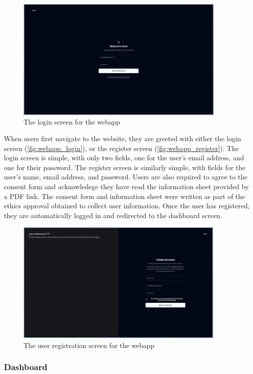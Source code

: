 \begin{figure}[htbp]
  \centering
  \includegraphics[height=6cm]{figures/fyp_login.jpeg}
  \captionsetup{justification=centering}
  \caption[Webapp Login]{The login screen for the webapp} \label{fig:webapp_login}
\end{figure}
When users first navigate to the website, they are greeted with either the login screen (\autoref{fig:webapp_login}), or the register screen (\autoref{fig:webapp_register}). The login screen is simple, with only two fields, one for the user's email address, and one for their password. The register screen is similarly simple, with fields for the user's name, email address, and password. Users are also required to agree to the consent form and acknowledege they have read the information sheet provided by a PDF link. The consent form and information sheet were written as part of the ethics approval obtained to collect user information. Once the user has registered, they are automatically logged in and redirected to the dashboard screen.
\begin{figure}[htbp]
  \centering
  \includegraphics[height=6cm]{figures/fyp_register.jpeg}
  \captionsetup{justification=centering}
  \caption[Webapp Register]{The user registration screen for the webapp} \label{fig:webapp_register}
\end{figure}
\subsubsection{Dashboard}


